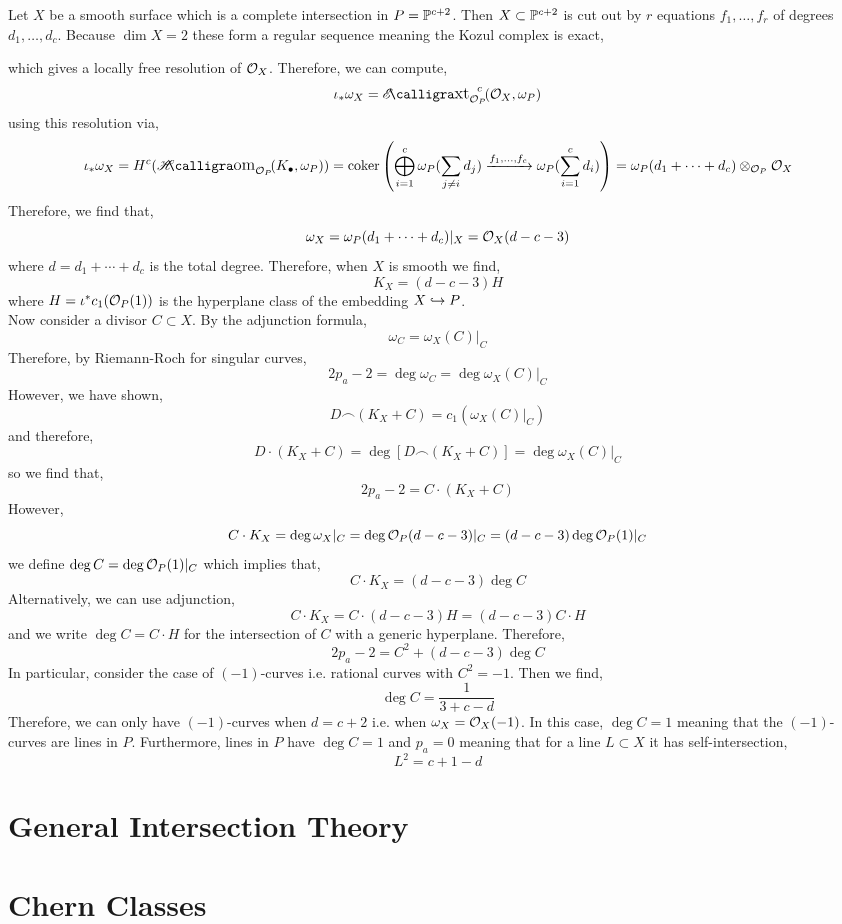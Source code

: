 \documentclass[12pt]{article}
\begin{document}
Let $X$ be a smooth surface which is a complete intersection in $P = \P^{c+2}$. Then $X \subset \P^{c+2}$ is cut out by $r$ equations $f_1, \dots, f_r$ of degrees $d_1, \dots, d_c$. Because $\dim{X} = 2$ these form a regular sequence meaning the Kozul complex is exact,
\begin{center}
\end{center}
which gives a locally free resolution of $\struct{X}$. Therefore, we can compute,
\[ \iota_* \omega_X = \shExt{c}{\struct{P}}{\struct{X}}{\omega_P} \]
using this resolution via,
\[ \iota_* \omega_X = H^c(\shHom{\struct{P}}{K_\bullet}{\omega_P}) = \coker{ \left( \bigoplus\limits_{i = 1}^c \omega_P( \sum_{j \neq i} d_j) \xrightarrow{f_1, \dots, f_c} \omega_P(\sum_{i = 1}^c d_i) \right)} = \omega_P(d_1 + \cdots + d_c) \otimes_{\struct{P}} \struct{X} \]
Therefore, we find that,
\[ \omega_X = \omega_P(d_1 + \cdots + d_c) |_X = \struct{X}(d - c - 3) \]
where $d = d_1 + \cdots + d_c$ is the total degree. Therefore, when $X$ is smooth we find,
\[ K_X = (d - c - 3) H \]
where $H = \iota^* c_1(\struct{P}(1))$ is the hyperplane class of the embedding $X \embed P$. 
\bigskip\\
Now consider a divisor $C \subset X$. By the adjunction formula,
\[ \omega_C = \omega_X(C)|_C \]
Therefore, by Riemann-Roch for singular curves,
\[ 2 p_a - 2 = \deg{\omega_C} = \deg{\omega_X(C)|_C} \]
However, we have shown,
\[ D \frown (K_X + C) = c_1(\omega_X(C)|_C) \]
and therefore,
\[ D \cdot (K_X + C) = \deg{[D \frown (K_X + C)]} = \deg{\omega_X(C)|_C} \]
so we find that,
\[ 2 p_a - 2 = C \cdot (K_X + C) \]
However, 
\[ C \cdot K_X = \deg{\omega_X |_C} = \deg{\struct{P}(d - c - 3)|_C} = (d - c - 3) \deg{\struct{P}(1)|_C} \]
we define $\deg{C} = \deg{\struct{P}(1)|_C}$ which implies that,
\[ C \cdot K_X = (d - c - 3) \deg{C} \]
Alternatively, we can use adjunction,
\[ C \cdot K_X = C \cdot (d - c - 3) H = (d - c - 3) C \cdot H \]
and we write $\deg{C} = C \cdot H$ for the intersection of $C$ with a generic hyperplane. Therefore,
\[ 2 p_a - 2 = C^2 + (d - c - 3) \deg{C} \]
In particular, consider the case of $(-1)$-curves i.e. rational curves with $C^2 = -1$. Then we find,
\[ \deg{C} = \frac{1}{3 + c - d} \]
Therefore, we can only have $(-1)$-curves when $d = c + 2$ i.e. when $\omega_X = \struct{X}(-1)$. In this case, $\deg{C} = 1$ meaning that the $(-1)$-curves are lines in $P$. Furthermore, lines in $P$ have $\deg{C} = 1$ and $p_a = 0$ meaning that for a line $L \subset X$ it has self-intersection,
\[ L^2 = c + 1 - d \]

\section{General Intersection Theory}

\section{Chern Classes}
\end{document}

